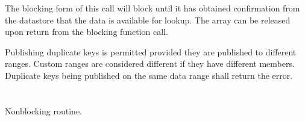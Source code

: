 The blocking form of this call will block until it has obtained confirmation from the datastore that the data is available for lookup. The  array can be released upon return from the blocking function call.

Publishing duplicate keys is permitted provided they are published to different
ranges. Custom ranges are considered different if they have different members.
Duplicate keys being published on the same data range shall return the
 error.


\section{}


\summary

Nonblocking  routine.

